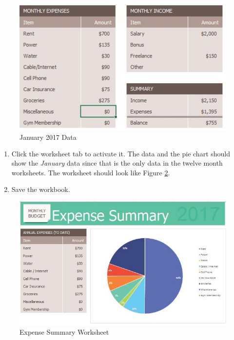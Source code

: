 \begin{figure}[H]
	\centering
	\includegraphics[width=\maxwidth{.95\linewidth}]{gfx/ch06_fig13}
	\caption{January 2017 Data}
	\label{06:fig13}
\end{figure}

\begin{enumerate}[resume]
	\item Click the  worksheet tab to activate it. The data and the pie chart should show the \textit{January} data since that is the only data in the twelve month worksheets. The worksheet should look like Figure \ref{06:fig14}.
	\item Save the  workbook.
\end{enumerate}

\begin{figure}[H]
	\centering
	\includegraphics[width=\maxwidth{.95\linewidth}]{gfx/ch06_fig14}
	\caption{Expense Summary Worksheet}
	\label{06:fig14}
\end{figure}

